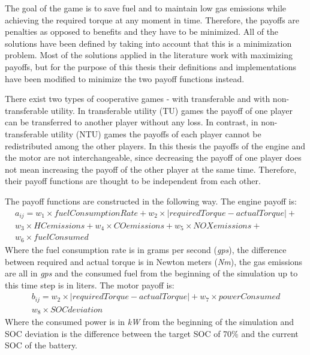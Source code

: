 The goal of the game is to save fuel and to maintain low gas emissions while achieving the required torque at any moment in time. Therefore, the payoffs are penalties as opposed to benefits and they have to be minimized. All of the solutions have been defined by taking into account that this is a minimization problem. Most of the solutions applied in the literature work with maximizing payoffs, but for the purpose of this thesis their definitions and implementations have been modified to minimize the two payoff functions instead. 


There exist two types of cooperative games - with transferable and with non-transferable utility. In transferable utility (TU) games the payoff of one player can be transferred to another player without any loss. In contrast, in non-transferable utility (NTU) games the payoffs of each player cannot be redistributed among the other players. In this thesis the payoffs of the engine and the motor are not interchangeable, since decreasing the payoff of one player does not mean increasing the payoff of the other player at the same time. Therefore, their payoff functions are thought to be independent from each other.

The payoff functions are constructed in the following way. The engine payoff is:
\begin{equation}
\begin{split}
a_{ij} = w_1 \times fuelConsumptionRate + w_2 \times | requiredTorque - actualTorque | + \\
w_3 \times HCemissions + w_4 \times COemissions + w_5 \times NOXemissions + \\
w_6 \times fuelConsumed
\end{split}
\end{equation}
Where the fuel consumption rate is in grams per second (\textit{gps}), the difference between required and actual torque is in Newton meters (\textit{Nm}), the gas emissions are all in \textit{gps} and the consumed fuel from the beginning of the simulation up to this time step is in liters. The motor payoff is:
\begin{equation}
\begin{split}
b_{ij} = w_2 \times | requiredTorque - actualTorque | + w_7 \times powerConsumed\\
w_8 \times SOCdeviation
\end{split}
\end{equation}
Where the consumed power is in \textit{kW} from the beginning of the simulation and SOC deviation is the difference between the target SOC of 70\% and the current SOC of the battery.

